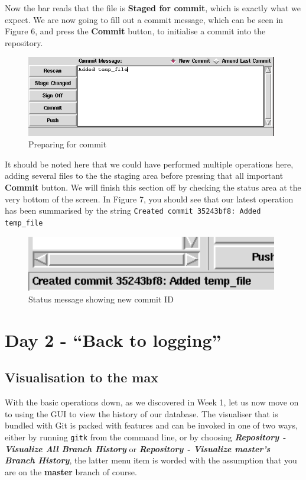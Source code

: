 Now the bar reads that the file is \textbf{Staged for commit}, which is exactly what we expect.  We are now going to fill out a commit message, which can be seen in Figure 6, and press the \textbf{Commit} button, to initialise a commit into the repository.

\begin{figure}[hbt]
\centering
\includegraphics[width=11cm]{images/f-w5-d6.png}
\caption{Preparing for commit}
\end{figure}

It should be noted here that we could have performed multiple operations here, adding several files to the the staging area before pressing that all important \textbf{Commit} button.  We will finish this section off by checking the status area at the very bottom of the screen.  In Figure 7, you should see that our latest operation has been summarised by the string \texttt{Created commit 35243bf8: Added temp\_file}

\begin{figure}[hbt]
\centering
\includegraphics[width=11cm]{images/f-w5-d7.png}
\caption{Status message showing new commit ID}
\end{figure}

\section{Day 2 - ``Back to logging''}
\subsection{Visualisation to the max}

With the basic operations down, as we discovered in Week 1, let us now move on to using the GUI to view the history of our database.  The visualiser that is bundled with Git is packed with features and can be invoked in one of two ways, either by running \texttt{gitk} from the command line, or by choosing \textbf{\emph{Repository - Visualize All Branch History}} or \textbf{\emph{Repository - Visualize master's Branch History}}, the latter menu item is worded with the assumption that you are on the \textbf{master} branch of course.

